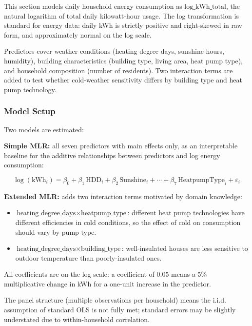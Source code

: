 \documentclass[
]{article}
\providecommand{\tightlist}{%
  \setlength{\itemsep}{0pt}\setlength{\parskip}{0pt}}
\begin{document}
This section models daily household energy consumption as
\(\text{log\_kWh\_total}\), the natural logarithm of total daily
kilowatt-hour usage. The log transformation is standard for energy data:
daily kWh is strictly positive and right-skewed in raw form, and
approximately normal on the log scale.

Predictors cover weather conditions (heating degree days, sunshine
hours, humidity), building characteristics (building type, living area,
heat pump type), and household composition (number of residents). Two
interaction terms are added to test whether cold-weather sensitivity
differs by building type and heat pump technology.

\subsubsection{Model Setup}\label{model-setup}

Two models are estimated:

\textbf{Simple MLR:} all seven predictors with main effects only, as an
interpretable baseline for the additive relationships between predictors
and log energy consumption:

\[
\log(\text{kWh}_i) = \beta_0 + \beta_1\,\text{HDD}_i + \beta_2\,\text{Sunshine}_i + \cdots + \beta_7\,\text{HeatpumpType}_i + \varepsilon_i
\]

\textbf{Extended MLR:} adds two interaction terms motivated by domain
knowledge:

\begin{itemize}
\tightlist
\item
  \(\text{heating\_degree\_days} \times \text{heatpump\_type}\):
  different heat pump technologies have different efficiencies in cold
  conditions, so the effect of cold on consumption should vary by pump
  type.
\item
  \(\text{heating\_degree\_days} \times \text{building\_type}\):
  well-insulated houses are less sensitive to outdoor temperature than
  poorly-insulated ones.
\end{itemize}

All coefficients are on the log scale: a coefficient of 0.05 means a 5\%
multiplicative change in kWh for a one-unit increase in the predictor.

The panel structure (multiple observations per household) means the
i.i.d. assumption of standard OLS is not fully met; standard errors may
be slightly understated due to within-household correlation.
\end{document}
